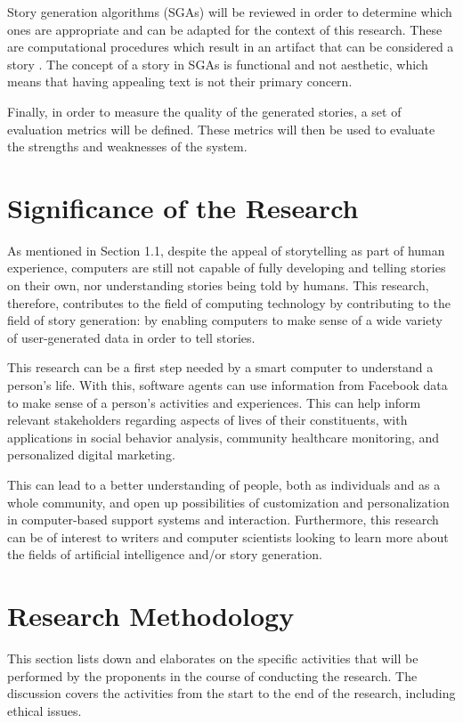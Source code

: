 Story generation algorithms (SGAs) will be reviewed in order to determine which ones are appropriate and can be adapted for the context of this research. These are computational procedures which result in an artifact that can be considered a story \cite{Gervas2012}. The concept of a story in SGAs is functional and not aesthetic, which means that having appealing text is not their primary concern. 

Finally, in order to measure the quality of the generated stories, a set of evaluation metrics will be defined. These metrics will then be used to evaluate the strengths and weaknesses of the system.

\section{Significance of the Research}
\label{sec:significance}

As mentioned in Section 1.1, despite the appeal of storytelling as part of human experience, computers are still not capable of fully developing and telling stories on their own, nor understanding stories being told by humans. This research, therefore, contributes to the field of computing technology by contributing to the field of story generation: by enabling computers to make sense of a wide variety of user-generated data in order to tell stories.

This research can be a first step needed by a smart computer to understand a person's life. With this, software agents can use information from Facebook data to make sense of a person's activities and experiences. This can help inform relevant stakeholders regarding aspects of lives of their constituents, with applications in social behavior analysis, community healthcare monitoring, and personalized digital marketing. 

This can lead to a better understanding of people, both as individuals and as a whole community, and open up possibilities of customization and personalization in computer-based support systems and interaction. Furthermore, this research can be of interest to writers and computer scientists looking to learn more about the fields of artificial intelligence and/or story generation.

\section{Research Methodology}
\label{sec:methodology}
This section lists down and elaborates on the specific activities that will be performed by the proponents in the course of conducting the research. The discussion covers the activities from the start to the end of the research, including ethical issues.

